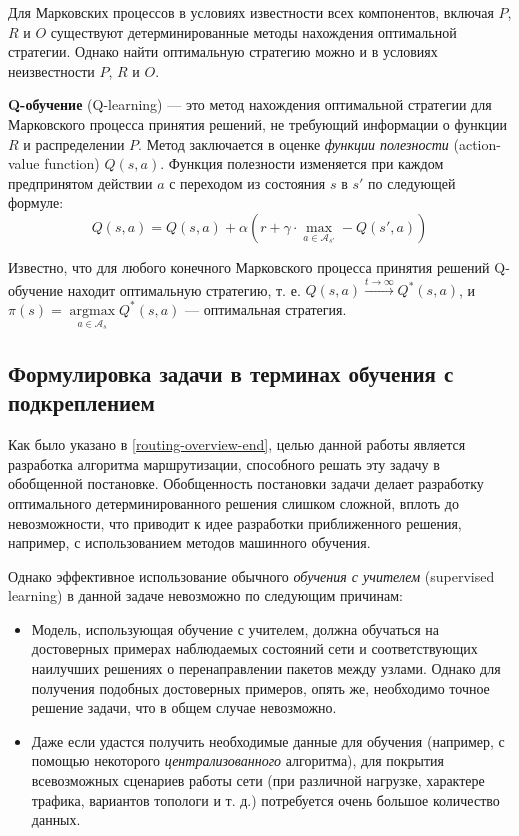 \documentclass[specification, annotation]{itmo-student-thesis}
\DeclareMathOperator{\argmax}{argmax}
\begin{document}
Для Марковских процессов в условиях известности всех компонентов, включая $P$,
$R$ и $O$ существуют детерминированные методы нахождения оптимальной стратегии.
Однако найти оптимальную стратегию можно и в условиях неизвестности $P$, $R$ и $O$.

\textbf{Q-обучение} (Q-learning)\cite{q-learning-orig} --- это метод нахождения
оптимальной стратегии для Марковского процесса принятия решений, не требующий
информации о функции $R$ и распределении $P$. Метод заключается в оценке
\textit{функции полезности} (action-value function)
$Q(s,a)$. Функция полезности изменяется при каждом предпринятом действии $a$ с
переходом из состояния $s$ в $s'$ по следующей формуле:
\[
Q(s, a) = Q(s, a) + \alpha \left( r +
\gamma \cdot \max\limits_{a \in \mathcal{A}_{s'}} - Q(s', a) \right)
\]

Известно, что для любого конечного Марковского процесса принятия решений
Q-обучение находит оптимальную стратегию, т. е. $Q(s, a) \xrightarrow{t
  \rightarrow \infty} Q^*(s, a)$, и $\pi(s) = \argmax\limits_{a \in
  \mathcal{A}_s} {Q^*(s, a)}$ --- оптимальная стратегия.

\subsection{Формулировка задачи в терминах обучения с подкреплением}\label{rl-task-formulation}

Как было указано в \ref{routing-overview-end}, целью данной работы является
разработка алгоритма маршрутизации, способного решать эту задачу в обобщенной
постановке. Обобщенность постановки задачи делает разработку оптимального
детерминированного решения слишком сложной, вплоть до невозможности, что
приводит к идее разработки приближенного решения, например, с использованием
методов машинного обучения.

Однако эффективное использование обычного \textit{обучения с учителем} (supervised
learning) в данной задаче невозможно по следующим причинам:

\begin{itemize}
  \item Модель, использующая обучение с учителем, должна обучаться на
    достоверных примерах наблюдаемых состояний сети и соответствующих наилучших
    решениях о перенаправлении пакетов между узлами. Однако для получения
    подобных достоверных примеров, опять же, необходимо точное решение задачи,
    что в общем случае невозможно.
  \item Даже если удастся получить необходимые данные для обучения (например,
    с помощью некоторого \textit{централизованного} алгоритма), для покрытия
    всевозможных сценариев работы сети (при различной нагрузке, характере
    трафика, вариантов топологи и т. д.) потребуется очень большое количество данных.
\end{itemize}
\end{document}
